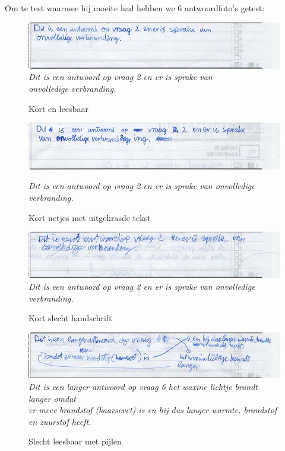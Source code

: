 \documentclass[12pt]{article}
\begin{document}
\begin{multicols}{2}
Om te test waarmee hij moeite had hebben we 6 antwoordfoto's getest:
\begin{figure}[H]
    \centering
    \includegraphics[width=1\linewidth]{./images/methoden/inscannen/tekst/kort_leesbaar.png}
    \textit{Dit is een antwoord op vraag 2 en er is sprake van\\
onvolledige verbranding.}
    \caption{Kort en leesbaar}
    \label{fig:enter-label}
\end{figure}
\begin{figure}[H]
    \centering
    \includegraphics[width=1\linewidth]{./images/methoden/inscannen/tekst/kort_leesbaar_uitgekrast.png}

    \textit{Dit is een antwoord op vraag 2 en er is sprake van onvolledige verbranding.}
    \caption{Kort netjes met uitgekrasde tekst}

    \label{fig:enter-label}
\end{figure}
\begin{figure}[H]
    \centering
    \includegraphics[width=1\linewidth]{./images/methoden/inscannen/tekst/kort_onleesbaar.png}
    \textit{Dit is een antwoord op vraag 2 en er is sprake van onvolledige verbranding.}
    \caption{Kort slecht handschrift}

    \label{fig:enter-label}
\end{figure}
\begin{figure}[H]
    \centering
    \includegraphics[width=1\linewidth]{./images/methoden/inscannen/tekst/slecht_leesbaar_pijlen.png}
    \textit{Dit is een langer antwoord op vraag 6 het waxine lichtje brandt langer omdat \\
er meer brandstof (kaarsevet) is en hij dus langer warmte, brandstof en zuurstof heeft.}
    \caption{Slecht leesbaar met pijlen}


\end{figure}
\end{multicols}
\end{document}
